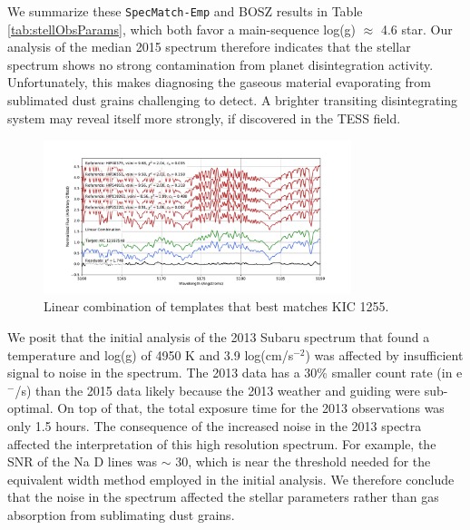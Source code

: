 \documentclass[preprint]{aastex61}
\begin{document}
We summarize these \texttt{SpecMatch-Emp} and BOSZ results in Table \ref{tab:stellObsParams}, which both favor a main-sequence log(g) $\approx$ 4.6 star.
Our analysis of the median 2015 spectrum therefore indicates that the stellar spectrum shows no strong contamination from planet disintegration activity.
Unfortunately, this makes diagnosing the gaseous material evaporating from sublimated dust grains challenging to detect.
A brighter transiting disintegrating system may reveal itself more strongly, if discovered in the TESS field.

\begin{figure}[!hbtp]
\begin{centering}
\includegraphics[width=0.8\textwidth]{images/subaru/lincomb_kic1255.pdf}
\caption{Linear combination of templates that best matches KIC 1255.}\label{fig:SpecMatch-EmpComb}
\end{centering}
\end{figure}

We posit that the initial analysis of the 2013 Subaru spectrum \citep{kawahara2013starspots} that found a temperature and log(g) of 4950 K and 3.9 log(cm/s$^{-2}$) was affected by insufficient signal to noise in the spectrum.
The 2013 data has a 30\% smaller count rate (in e$^-$/s) than the 2015 data likely because the 2013 weather and guiding were sub-optimal.
On top of that, the total exposure time for the 2013 observations was only 1.5 hours.
The consequence of the increased noise in the 2013 spectra affected the interpretation of this high resolution spectrum.
For example, the SNR of the Na D lines was $\sim$ 30, which is near the threshold needed for the \citet{takeda2005specFGKdwarfs} equivalent width method employed in the initial analysis.
We therefore conclude that the noise in the spectrum affected the stellar parameters rather than gas absorption from sublimating dust grains.
\end{document}
